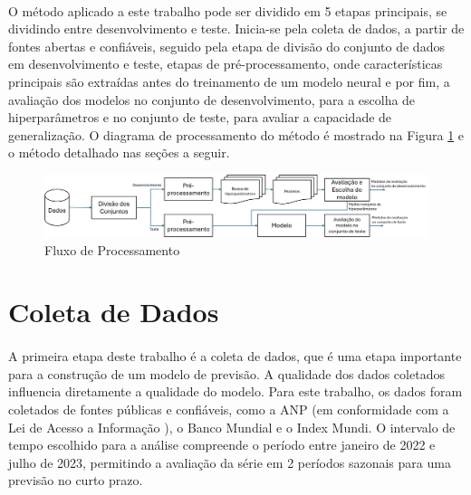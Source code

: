 \paragraph{} O método aplicado a este trabalho pode ser dividido em 5 etapas principais, se dividindo entre desenvolvimento e teste. Inicia-se pela coleta de dados, a partir de fontes abertas e confiáveis, seguido pela etapa de divisão do conjunto de dados em desenvolvimento e teste, etapas de pré-processamento, onde características principais são extraídas antes do treinamento de um modelo neural e por fim, a avaliação dos modelos no conjunto de desenvolvimento, para a escolha de hiperparâmetros e no conjunto de teste, para avaliar a capacidade de generalização. O diagrama de processamento do método é mostrado na Figura \ref{fig:processamento_diagram} e o método detalhado nas seções a seguir.

\begin{figure}
	\begin{center}
		\begin{center}
			\includegraphics[width=\textwidth]{figuras/processamento_diagram.png}
			\caption{Fluxo de Processamento}
			\label{fig:processamento_diagram}
		\end{center}

	\end{center}
\end{figure}

\section{Coleta de Dados}

\paragraph{} A primeira etapa deste trabalho é a coleta de dados, que é uma etapa importante para a construção de um modelo de previsão. A qualidade dos dados coletados influencia diretamente a qualidade do modelo. Para este trabalho, os dados foram coletados de fontes públicas e confiáveis, como a \ac{ANP} (em conformidade com a Lei de Acesso a Informação \cite{lei12527}), o Banco Mundial e o Index Mundi. O intervalo de tempo escolhido para a análise compreende o período entre janeiro de 2022 e julho de 2023, permitindo a avaliação da série em 2 períodos sazonais para uma previsão no curto prazo.
